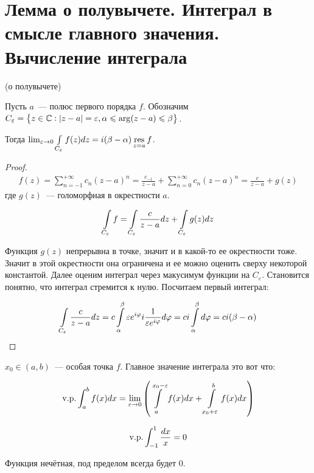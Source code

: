 \section{Лемма о полувычете. Интеграл в смысле главного значения. Вычисление интеграла}

\begin{lemma}(о полувычете)

    Пусть $a$~--- полюс первого порядка $f$.
    Обозначим $C_{\varepsilon} = \left\{
        z \in \mathbb{C} :
        |z-a| = \varepsilon,
        \alpha \leqslant \arg(z-a) \leqslant \beta
        \right\}$.

    Тогда $\lim_{\varepsilon \to 0} \int\limits_{C_\varepsilon} f(z)dz
        = i(\beta - \alpha)\operatorname*{res}\limits_{z=a} f$.
\end{lemma}

\begin{proof}
    \begin{gather*}
        f(z) = \sum\limits_{n=-1}^{+\infty} c_n (z - a)^n = \frac{c_{-1}}{z-a} + \sum\limits_{n=0}^{+\infty} c_n(z-a)^n = \frac{c}{z-a} + g(z)
    \end{gather*}
    где $g(z)$~--- голоморфная в окрестности $a$.

    \[
        \int\limits_{C_\varepsilon} f = \int\limits_{C_\varepsilon} \frac{c}{z-a}dz + \int\limits_{C_\varepsilon}
        g(z)dz
    \]

    Функция $g(z)$ непрерывна в точке, значит и в какой-то ее окрестности тоже. Значит в этой окрестности она ограничена и ее можно оценить сверху некоторой константой. Далее оценим интеграл через макусимум функции на $C_\varepsilon$. Становится понятно, что интеграл стремится к нулю. Посчитаем первый интеграл:

    \[
        \int\limits_{C_\varepsilon} \frac{c}{z-a}dz
        = c \int\limits_\alpha^\beta \varepsilon e^{i\varphi} i \frac{1}{\varepsilon e^{i\varphi}}
        d\varphi = ci \int\limits_\alpha^\beta d\varphi = ci (\beta - \alpha)
    \]
\end{proof}

\begin{definition}
    $x_0 \in (a, b)$~--- особая точка $f$.
    Главное значение интеграла это вот что:

    \[
        \mathrm{v. p. }\int_a^b f(x)dx = \lim_{\varepsilon\to0}
        \left(
        \int\limits_a^{x_0 - \varepsilon} f(x)dx
        + \int\limits_{x_0 + \varepsilon}^b f(x)dx
        \right)
    \]
\end{definition}

\begin{example}
    \[
        \mathrm{v. p. }\int_{-1}^1 \frac{dx}{x} = 0
    \]

    Функция нечётная, под пределом всегда будет $0$.
\end{example}

